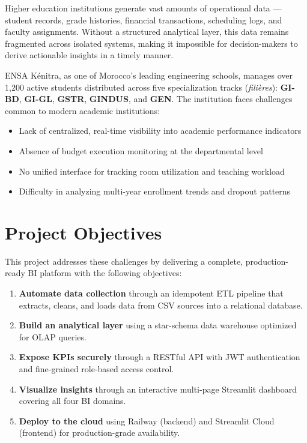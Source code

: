 \documentclass[12pt, a4paper]{report}
\begin{document}
Higher education institutions generate vast amounts of operational data — student records, grade histories, financial transactions, scheduling logs, and faculty assignments. Without a structured analytical layer, this data remains fragmented across isolated systems, making it impossible for decision-makers to derive actionable insights in a timely manner.

ENSA Kénitra, as one of Morocco's leading engineering schools, manages over 1,200 active students distributed across five specialization tracks (\textit{filières}): \textbf{GI-BD}, \textbf{GI-GL}, \textbf{GSTR}, \textbf{GINDUS}, and \textbf{GEN}. The institution faces challenges common to modern academic institutions:

\begin{itemize}
  \item Lack of centralized, real-time visibility into academic performance indicators
  \item Absence of budget execution monitoring at the departmental level
  \item No unified interface for tracking room utilization and teaching workload
  \item Difficulty in analyzing multi-year enrollment trends and dropout patterns
\end{itemize}

\section{Project Objectives}

This project addresses these challenges by delivering a complete, production-ready BI platform with the following objectives:

\begin{enumerate}
  \item \textbf{Automate data collection} through an idempotent ETL pipeline that extracts, cleans, and loads data from CSV sources into a relational database.
  \item \textbf{Build an analytical layer} using a star-schema data warehouse optimized for OLAP queries.
  \item \textbf{Expose KPIs securely} through a RESTful API with JWT authentication and fine-grained role-based access control.
  \item \textbf{Visualize insights} through an interactive multi-page Streamlit dashboard covering all four BI domains.
  \item \textbf{Deploy to the cloud} using Railway (backend) and Streamlit Cloud (frontend) for production-grade availability.
\end{enumerate}
\end{document}
